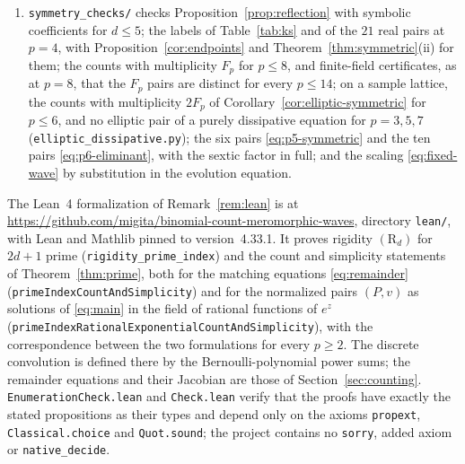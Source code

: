 \begin{enumerate}
convolution to a residual system of degree at most \(g\); the
prime-power case \(g=0\) is also in the companion note. The certificate
retains every residual degree, with integer ideal-membership identities
and certified prime factors; the replay multiplies out every identity
and checks all 72 arithmetic choices. It does not infer
characteristic-zero nonexistence from lists of residue-field points.
\item \texttt{symmetry\_checks/} checks Proposition~\ref{prop:reflection}
with symbolic coefficients for \(d\le5\); the labels of
Table~\ref{tab:ks} and of the \(21\) real pairs at \(p=4\), with
Proposition~\ref{cor:endpoints} and Theorem~\ref{thm:symmetric}(ii) for
them; the counts with multiplicity \(F_p\) for \(p\le8\), and
finite-field certificates, as at \(p=8\), that the \(F_p\) pairs are
distinct for every \(p\le14\); on a sample lattice, the counts with
multiplicity \(2F_p\) of Corollary~\ref{cor:elliptic-symmetric} for
\(p\le6\), and no elliptic pair of a purely dissipative equation for
\(p=3,5,7\) (\texttt{elliptic\_dissipative.py}); the six pairs
\eqref{eq:p5-symmetric} and the ten pairs \eqref{eq:p6-eliminant}, with
the sextic factor in full; and the scaling \eqref{eq:fixed-wave} by
substitution in the evolution equation.
\end{enumerate}

The Lean~4 formalization of Remark~\ref{rem:lean} is at
\url{https://github.com/migita/binomial-count-meromorphic-waves},
directory \texttt{lean/}, with Lean and Mathlib pinned to
version~4.33.1. It proves rigidity \((\mathrm R_d)\) for \(2d+1\) prime
(\texttt{rigidity\_prime\_index}) and the count and simplicity
statements of Theorem~\ref{thm:prime}, both for the matching equations
\eqref{eq:remainder} (\texttt{primeIndexCountAndSimplicity}) and for
the normalized pairs \((P,v)\) as solutions of \eqref{eq:main} in the
field of rational functions of \(e^{z}\)
(\texttt{primeIndexRationalExponentialCountAndSimplicity}), with the
correspondence between the two formulations for every \(p\ge2\). The
discrete convolution is defined there by the Bernoulli-polynomial power
sums; the remainder equations and their Jacobian are those of
Section~\ref{sec:counting}. \texttt{EnumerationCheck.lean} and
\texttt{Check.lean} verify that the proofs have exactly the stated
propositions as their types and depend only on the axioms
\texttt{propext}, \texttt{Classical.choice} and \texttt{Quot.sound}; the
project contains no \texttt{sorry}, added axiom or
\texttt{native\_decide}.
